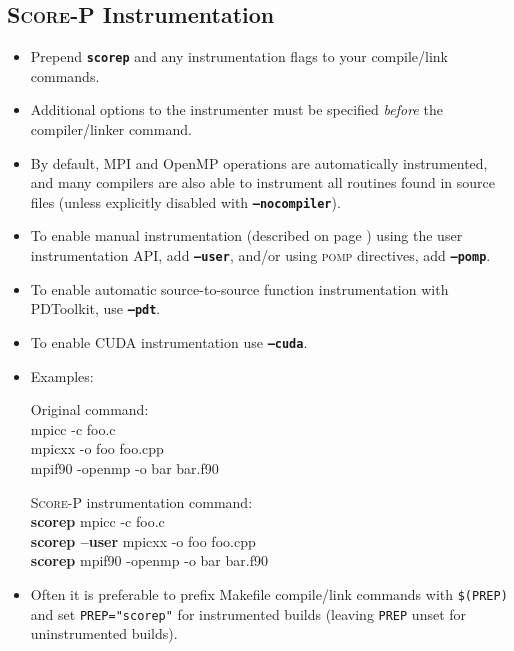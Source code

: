 \documentclass[a4paper]{article}
\newcommand{\Scorep}{\textsc{Score-P}\xspace}
\begin{document}
\subsection*{\Scorep Instrumentation}
\begin{itemize}
  \item Prepend \textbf{\texttt{scorep}} and any instrumentation flags to your 
        compile/link commands.
  \item Additional options to the instrumenter must be specified
        \textit{before} the compiler/linker command.
  \item By default, MPI and OpenMP operations are automatically instrumented, and
        many compilers are also able to instrument all routines found in source files
        (unless explicitly disabled with \textbf{\texttt{--nocompiler}}).
  \item To enable manual instrumentation (described on page \pageref{sec:manual_inst})
        using the user instrumentation API, add \textbf{\texttt{--user}},
        and/or using \textsc{pomp} directives, add \textbf{\texttt{--pomp}}.
  \item To enable automatic source-to-source function instrumentation with PDToolkit, use \textbf{\texttt{--pdt}}.
  \item To enable CUDA instrumentation use \textbf{\texttt{--cuda}}.
  \item Examples: \\
    \begin{minipage}[t]{0.4\linewidth}
      Original command: \\\ttfamily
      mpicc -c foo.c \\
      mpicxx -o foo foo.cpp \\
      mpif90 -openmp -o bar bar.f90
    \end{minipage}
    \begin{minipage}[t]{0.59\linewidth}
      \Scorep instrumentation command: \\\ttfamily
      \textbf{scorep} mpicc -c foo.c \\
      \textbf{scorep --user} mpicxx -o foo foo.cpp \\
      \textbf{scorep} mpif90 -openmp -o bar bar.f90
    \end{minipage}
  \item Often it is preferable to prefix Makefile compile/link commands
        with \texttt{\$(PREP)} and set \texttt{PREP="scorep"} for
        instrumented builds (leaving \texttt{PREP} unset for uninstrumented builds).
\end{itemize}
\end{document}
